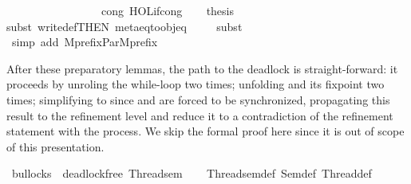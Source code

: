 \begin{isabellebody}
\ \ \ \ \ \ \ \ \ \ \ \ \ \ \ \ \ cong{\isacharcolon}{\kern0pt}\ HOL{\isachardot}{\kern0pt}if{\isacharunderscore}{\kern0pt}cong{\isacharparenright}{\kern0pt}\isanewline
\ \ \isamarkupfalse%
\ {\isacharquery}{\kern0pt}thesis\isanewline
\ \ \ \ \isamarkupfalse%
{\isacharparenleft}{\kern0pt}subst{\isacharparenleft}{\kern0pt}{}{\isacharparenright}{\kern0pt}\ write{}{\isacharunderscore}{\kern0pt}def{\isacharbrackleft}{\kern0pt}THEN\ meta{\isacharunderscore}{\kern0pt}eq{\isacharunderscore}{\kern0pt}to{\isacharunderscore}{\kern0pt}obj{\isacharunderscore}{\kern0pt}eq{\isacharbrackright}{\kern0pt}{\isacharparenright}{\kern0pt}\isanewline
\ \ \ \ \isamarkupfalse%
{\isacharparenleft}{\kern0pt}subst\ {}{\isacharparenright}{\kern0pt}\isanewline
\ \ \ \ \isamarkupfalse%
\ {\isacharparenleft}{\kern0pt}simp\ add{\isacharcolon}{\kern0pt}\ Mprefix{\isacharunderscore}{\kern0pt}Par{\isacharunderscore}{\kern0pt}Mprefix{\isacharparenright}{\kern0pt}\isanewline
{}\isamarkupfalse%
%
\endisatagproof
{\isafoldproof}%
%
\isadelimproof
%
\endisadelimproof
%
\begin{isamarkuptext}%
After these preparatory lemmas, the path to the deadlock is straight-forward:
it proceeds by unroling the while-loop two times; unfolding
 and its fixpoint two times; simplifying to 
since  and  are forced  to be synchronized, 
propagating this result to the refinement level and reduce it to a contradiction
of the refinement statement with the  process.
We skip the formal proof here since it is out of scope of this presentation.%
\end{isamarkuptext}\isamarkuptrue%
\isamarkupfalse%
\ bullocks{\isacharcolon}{\kern0pt}\ {\isacartoucheopen}{\isasymnot}\ deadlock{\isacharunderscore}{\kern0pt}free\ Thread{}{\isacharunderscore}{\kern0pt}sem{\isacartoucheclose}\isanewline
%
\isadelimproof
\ \ %
\endisadelimproof
%
\isatagproof
{}\isamarkupfalse%
\ Thread{}{\isacharunderscore}{\kern0pt}sem{\isacharunderscore}{\kern0pt}def\ Sem{\isacharunderscore}{\kern0pt}def\ Thread{}{\isacharunderscore}{\kern0pt}def\isanewline
{}\isamarkupfalse%
\ {\isacharminus}{\kern0pt}\ \isanewline

\end{isabellebody}
